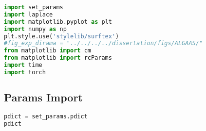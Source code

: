 \begin{spacing}{1} \begin{lstlisting}[frame=single, language=Python]
import set_params
import laplace
import matplotlib.pyplot as plt
import numpy as np
plt.style.use('stylelib/surftex')
#fig_exp_dirama = "../../../../dissertation/figs/ALGAAS/"
from matplotlib import cm
from matplotlib import rcParams
import time
import torch
\end{lstlisting} \end{spacing}

\hypertarget{params-import}{%
\subsection{Params Import}\label{params-import}}

\begin{spacing}{1} \begin{lstlisting}[frame=single, language=Python]
pdict = set_params.pdict
pdict
\end{lstlisting} \end{spacing}

